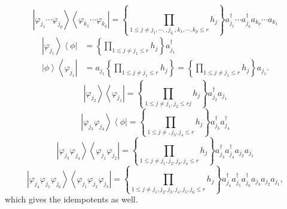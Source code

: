\documentclass[aps,preprint]{revtex4}%
\begin{document}
\begin{equation}
\left\vert \varphi_{j_{1}}\cdots\varphi_{j_{p}}\right\rangle \left\langle
\varphi_{k_{1}}\cdots\varphi_{k_{q}}\right\vert =\left\{
{\displaystyle\prod\limits_{1\leq j\neq j_{1},\cdots,,j_{q,},k_{1}%
,\cdots,k_{p}\leq r}}
h_{j}\right\}  a_{j_{1}}^{\dagger}\cdots a_{j_{q}}^{\dagger}a_{k_{p}}\cdots
a_{k_{1}}%
\end{equation}%
\begin{align}
\left\vert \varphi_{j_{1}}\right\rangle \left\langle \phi\right\vert  &
=\left\{
{\displaystyle\prod\limits_{1\leq j\neq j_{1}\leq r}}
h_{j}\right\}  a_{j_{1}}^{\dagger}\\
\left\vert \phi\right\rangle \left\langle \varphi_{j_{1}}\right\vert  &
=a_{j_{1}}\left\{
{\displaystyle\prod\limits_{1\leq j\neq j_{1}\leq r}}
h_{j}\right\}  =\left\{
{\displaystyle\prod\limits_{1\leq j\neq j_{1}\leq r}}
h_{j}\right\}  a_{j_{1}}.
\end{align}%
\begin{equation}
\left\vert \varphi_{j_{2}}\right\rangle \left\langle \varphi_{j_{1}%
}\right\vert =\left\{
{\displaystyle\prod\limits_{1\leq j\neq j_{1},j_{2}\leq rj}}
h_{j}\right\}  a_{j_{2}}^{\dagger}a_{j_{1}}%
\end{equation}%
\begin{equation}
\left\vert \varphi_{j_{3}}\varphi_{j_{4}}\right\rangle \left\langle
\phi\right\vert =\left\{
{\displaystyle\prod\limits_{1\leq j\neq,j_{3},j_{4}\leq r}}
h_{j}\right\}  a_{j_{3}}^{\dagger}a_{j_{4}}^{\dagger}%
\end{equation}%
\begin{equation}
\left\vert \varphi_{j_{3}}\varphi_{j_{4}}\right\rangle \left\langle
\varphi_{j_{1}}\varphi_{j_{2}}\right\vert =\left\{
{\displaystyle\prod\limits_{1\leq j\neq j_{1},j_{2},j_{3},j_{4}\leq r}}
h_{j}\right\}  a_{j_{3}}^{\dagger}a_{j_{4}}^{\dagger}a_{j_{2}}a_{j_{1}}%
\end{equation}%
\begin{equation}
\left\vert \varphi_{j_{4}}\varphi_{j_{5}}\varphi_{j_{6}}\right\rangle
\left\langle \varphi_{j_{1}}\varphi_{j_{2}}\varphi_{j_{3}}\right\vert
=\left\{
{\displaystyle\prod\limits_{1\leq j\neq j_{1},j_{2},j_{3},j_{4},j_{5}%
,j_{6}\leq r}}
h_{j}\right\}  a_{j_{4}}^{\dagger}a_{j_{5}}^{\dagger}a_{j_{6}}^{\dagger
}a_{j_{3}}a_{j_{2}}a_{j_{1}},
\end{equation}
which gives the idempotents as well.
\end{document}
